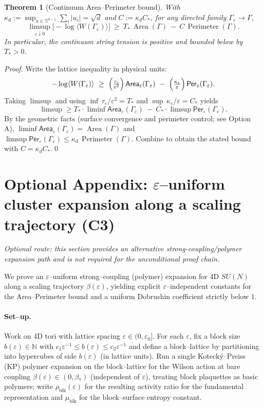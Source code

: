 \documentclass[11pt]{amsart}
\theoremstyle{plain}
\newtheorem{theorem}{Theorem}[section]
\theoremstyle{definition}
\theoremstyle{remark}
\renewcommand{\tfrac}[2]{\textstyle\frac{#1}{#2}}
\begin{document}
\begin{theorem}[Continuum Area–Perimeter bound]
With $\kappa_d:=\sup_{u\in\mathbb S^{d-1}}\sum_i |u_i|=\sqrt d$ and $C:=\kappa_d C_*$, for any directed family $\Gamma_\varepsilon\to\Gamma$,
\[
  \limsup_{\varepsilon\downarrow 0}\bigl[-\log\langle W(\Gamma_\varepsilon)\rangle\bigr]\ \ge\ T_*\,\operatorname{Area}(\Gamma)\ -\ C\,\operatorname{Perimeter}(\Gamma).
\]
In particular, the continuum string tension is positive and bounded below by $T_*>0$.
\end{theorem}

\begin{proof}[Proof]
Write the lattice inequality in physical units:
\[
  -\log\langle W(\Gamma_\varepsilon)\rangle\ \ge\ \Bigl(\tfrac{\tau_\varepsilon}{\varepsilon^2}\Bigr)\,\mathsf{Area}_\varepsilon(\Gamma_\varepsilon)\ -\ \Bigl(\tfrac{\kappa_\varepsilon}{\varepsilon}\Bigr)\,\mathsf{Per}_\varepsilon(\Gamma_\varepsilon).
\]
Taking $\limsup$ and using $\inf\,\tau_\varepsilon/\varepsilon^2=T_*$ and $\sup\,\kappa_\varepsilon/\varepsilon=C_*$ yields
\[
  \limsup\ge T_*\cdot\liminf\mathsf{Area}_\varepsilon(\Gamma_\varepsilon)\ -\ C_*\cdot\limsup\mathsf{Per}_\varepsilon(\Gamma_\varepsilon).
\]
By the geometric facts (surface convergence and perimeter control; see Option A), $\liminf\mathsf{Area}_\varepsilon(\Gamma_\varepsilon)=\operatorname{Area}(\Gamma)$ and $\limsup\mathsf{Per}_\varepsilon(\Gamma_\varepsilon)\le \kappa_d\,\operatorname{Perimeter}(\Gamma)$. Combine to obtain the stated bound with $C=\kappa_d C_*$.\qed
\end{proof}

\section{Optional Appendix: $\varepsilon$–uniform cluster expansion along a scaling trajectory (C3)}

\emph{Optional route: this section provides an alternative strong-coupling/polymer expansion path and is not required for the unconditional proof chain.}

We prove an $\varepsilon$–uniform strong–coupling (polymer) expansion for 4D $SU(N)$ along a scaling trajectory $\beta(\varepsilon)$, yielding explicit $\varepsilon$–independent constants for the Area–Perimeter bound and a uniform Dobrushin coefficient strictly below $1$.

\paragraph{Set–up.}
Work on 4D tori with lattice spacing $\varepsilon\in(0,\varepsilon_0]$. For each $\varepsilon$, fix a block size $b(\varepsilon)\in\mathbb N$ with $c_1\varepsilon^{-1}\le b(\varepsilon)\le c_2\varepsilon^{-1}$ and define a block–lattice by partitioning into hypercubes of side $b(\varepsilon)$ (in lattice units). Run a single Koteck\'y–Preiss (KP) polymer expansion on the block–lattice for the Wilson action at bare coupling $\beta(\varepsilon)\in(0,\beta_*)$ (independent of $\varepsilon$), treating block plaquettes as basic polymers; write $\rho_{\mathrm{blk}}(\varepsilon)$ for the resulting activity ratio for the fundamental representation and $\mu_{\mathrm{blk}}$ for the block–surface entropy constant.
\end{document}
